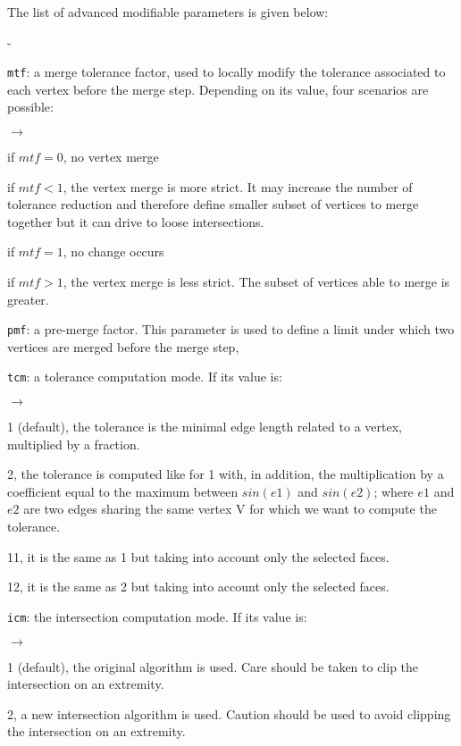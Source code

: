 {{{{The list of advanced modifiable parameters is given below:
\begin{list}{-}{}
\item \texttt{mtf}: a merge tolerance factor, used to locally modify the tolerance associated to each vertex before the merge step. Depending on its value, four
scenarios are possible:
\begin{list}{$\rightarrow$}{}
\item if $mtf=0$, no vertex merge
\item if $mtf<1$, the vertex merge is more strict. It may increase the number of tolerance reduction and therefore define smaller subset of vertices to merge together but it can drive to loose intersections.
\item if $mtf=1$, no change occurs
\item if $mtf>1$, the vertex merge is less strict. The subset of vertices able to merge is greater.
\end{list}
\item \texttt{pmf}: a pre-merge factor. This parameter is used to define a limit under which two vertices are merged before the merge step,
\item \texttt{tcm}: a tolerance computation mode. If its value is:
\begin{list}{$\rightarrow$}{}
\item 1 (default), the tolerance is the minimal edge length related to a vertex, multiplied by a fraction.
\item 2, the tolerance is computed like for 1 with, in addition, the multiplication by a coefficient equal to the maximum between $sin(e1)$ and $sin(e2)$; where $e1$ and $e2$ are two edges sharing the same vertex V for which we want to compute the tolerance.
\item 11, it is the same as 1 but taking into account only the selected faces.
\item 12, it is the same as 2 but taking into account only the selected faces.
\end{list}
\item \texttt{icm}: the intersection computation mode. If its value is:
\begin{list}{$\rightarrow$}{}
\item 1 (default), the original algorithm is used. Care should be taken to clip the intersection on an extremity.
\item 2, a new intersection algorithm is used. Caution should be used to avoid clipping the intersection on an extremity.
\end{list}

\end{list}}}}}
